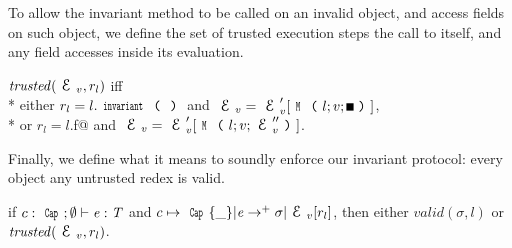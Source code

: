 \noindent 
To allow the invariant method to be called on an invalid object, and access fields on such object, we define the set of trusted execution steps  the call to \Q@invariant@ itself, and any field accesses inside its evaluation. 

\loseSpace
\noindent $\mathit{trusted}(\ctx_v,r_l)$ iff\\*
\indent either
$r_l=l.\invariant$ and
$\ctx_v=\ctx_v'[\Kw{M}\oR l;v;\square\cR]$,\\*
\indent or
$r_l=l$\Q@.f@ and
$\ctx_v=\ctx_v'[\Kw{M}\oR l;v;\ctx_v''\cR]$.
\loseSpace

\noindent Finally, we define what it means to soundly enforce our invariant protocol: every object  any untrusted redex is valid.

\begin{theorem}[Soundness]
if $c:\Kw{Cap};\emptyset\vdash \e: \T$ and
$c\mapsto\Kw{Cap}\{\_\}|\e\rightarrow^+ \sigma|\ctx_v[r_l]$, then
either $\mathit{valid}(\sigma,l)$ or $\mathit{trusted}(\ctx_v,r_l)$.
\end{theorem}



